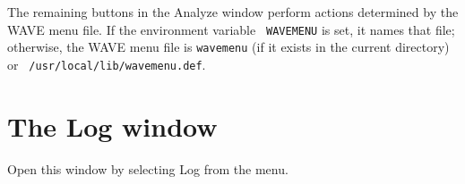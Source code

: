 \documentclass[twoside]{book}
\newcommand{\button}[1]{\cornersize{2}\ovalbox{\rule[-.3mm]{0cm}{2.5mm}\small\sf ~#1~}}
\newcommand{\menubutton}[1]{\button{#1~\ensuremath{\nabla}}}
\newcommand{\WAVE}{{\sf WAVE}\xspace}
\begin{document}
The remaining buttons in the {\sf Analyze} window perform actions
determined by the \WAVE{} menu file. If the environment variable {\tt
WAVEMENU} is set, it names that file; otherwise, the \WAVE{} menu file
is {\tt wavemenu} (if it exists in the current directory) or {\tt
/usr/local/lib/wavemenu.def}.

\section{The {\sf Log} window}

\begin{figure}[h]
\centerline{}
\end{figure}
\label{sec:log-window}
Open this window by selecting {\sf Log} from the \menubutton{File} menu.
\end{document}
